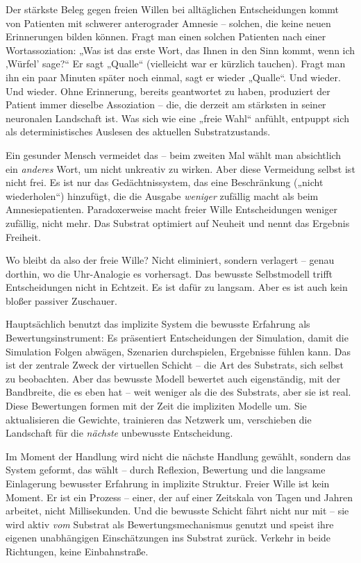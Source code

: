 \documentclass[11pt, twoside, openright]{book}
\begin{document}
Der stärkste Beleg gegen freien Willen bei alltäglichen Entscheidungen kommt von Patienten mit schwerer anterograder Amnesie -- solchen, die keine neuen Erinnerungen bilden können. Fragt man einen solchen Patienten nach einer Wortassoziation: „Was ist das erste Wort, das Ihnen in den Sinn kommt, wenn ich ‚Würfel' sage?“ Er sagt „Qualle“ (vielleicht war er kürzlich tauchen). Fragt man ihn ein paar Minuten später noch einmal, sagt er wieder „Qualle“. Und wieder. Und wieder. Ohne Erinnerung, bereits geantwortet zu haben, produziert der Patient immer dieselbe Assoziation -- die, die derzeit am stärksten in seiner neuronalen Landschaft ist. Was sich wie eine „freie Wahl“ anfühlt, entpuppt sich als deterministisches Auslesen des aktuellen Substratzustands.

Ein gesunder Mensch vermeidet das -- beim zweiten Mal wählt man absichtlich ein \textit{anderes} Wort, um nicht unkreativ zu wirken. Aber diese Vermeidung selbst ist nicht frei. Es ist nur das Gedächtnissystem, das eine Beschränkung („nicht wiederholen“) hinzufügt, die die Ausgabe \textit{weniger} zufällig macht als beim Amnesiepatienten. Paradoxerweise macht freier Wille Entscheidungen weniger zufällig, nicht mehr. Das Substrat optimiert auf Neuheit und nennt das Ergebnis Freiheit.

Wo bleibt da also der freie Wille? Nicht eliminiert, sondern verlagert -- genau dorthin, wo die Uhr-Analogie es vorhersagt. Das bewusste Selbstmodell trifft Entscheidungen nicht in Echtzeit. Es ist dafür zu langsam. Aber es ist auch kein bloßer passiver Zuschauer.

Hauptsächlich benutzt das implizite System die bewusste Erfahrung als Bewertungsinstrument: Es präsentiert Entscheidungen der Simulation, damit die Simulation Folgen abwägen, Szenarien durchspielen, Ergebnisse fühlen kann. Das ist der zentrale Zweck der virtuellen Schicht -- die Art des Substrats, sich selbst zu beobachten. Aber das bewusste Modell bewertet auch eigenständig, mit der Bandbreite, die es eben hat -- weit weniger als die des Substrats, aber sie ist real. Diese Bewertungen formen mit der Zeit die impliziten Modelle um. Sie aktualisieren die Gewichte, trainieren das Netzwerk um, verschieben die Landschaft für die \textit{nächste} unbewusste Entscheidung.

Im Moment der Handlung wird nicht die nächste Handlung gewählt, sondern das System geformt, das wählt -- durch Reflexion, Bewertung und die langsame Einlagerung bewusster Erfahrung in implizite Struktur. Freier Wille ist kein Moment. Er ist ein Prozess -- einer, der auf einer Zeitskala von Tagen und Jahren arbeitet, nicht Millisekunden. Und die bewusste Schicht fährt nicht nur mit -- sie wird aktiv \textit{vom} Substrat als Bewertungsmechanismus genutzt und speist ihre eigenen unabhängigen Einschätzungen ins Substrat zurück. Verkehr in beide Richtungen, keine Einbahnstraße.
\end{document}
